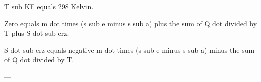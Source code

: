 T sub KF equals 298 Kelvin.  

Zero equals m dot times (s sub e minus s sub a) plus the sum of Q dot divided by T plus S dot sub erz.  

S dot sub erz equals negative m dot times (s sub e minus s sub a) minus the sum of Q dot divided by T.  

---